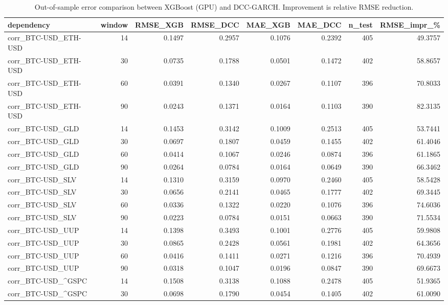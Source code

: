 \begin{table}[H]
\centering
\small
\caption{Out-of-sample error comparison between XGBoost (GPU) and DCC-GARCH. Improvement is relative RMSE reduction.}
\label{tab:rmse_xgb_vs_dcc}
\begin{tabular}{lrrrrrrr}
\toprule
dependency & window & RMSE\_XGB & RMSE\_DCC & MAE\_XGB & MAE\_DCC & n\_test & RMSE\_impr\_\% \\
\midrule
corr\_BTC-USD\_ETH-USD & 14 & 0.1497 & 0.2957 & 0.1076 & 0.2392 & 405 & 49.3757 \\
corr\_BTC-USD\_ETH-USD & 30 & 0.0735 & 0.1788 & 0.0501 & 0.1472 & 402 & 58.8657 \\
corr\_BTC-USD\_ETH-USD & 60 & 0.0391 & 0.1340 & 0.0267 & 0.1107 & 396 & 70.8033 \\
corr\_BTC-USD\_ETH-USD & 90 & 0.0243 & 0.1371 & 0.0164 & 0.1103 & 390 & 82.3135 \\
corr\_BTC-USD\_GLD & 14 & 0.1453 & 0.3142 & 0.1009 & 0.2513 & 405 & 53.7441 \\
corr\_BTC-USD\_GLD & 30 & 0.0697 & 0.1807 & 0.0459 & 0.1455 & 402 & 61.4046 \\
corr\_BTC-USD\_GLD & 60 & 0.0414 & 0.1067 & 0.0246 & 0.0874 & 396 & 61.1865 \\
corr\_BTC-USD\_GLD & 90 & 0.0264 & 0.0784 & 0.0164 & 0.0649 & 390 & 66.3462 \\
corr\_BTC-USD\_SLV & 14 & 0.1310 & 0.3159 & 0.0970 & 0.2460 & 405 & 58.5428 \\
corr\_BTC-USD\_SLV & 30 & 0.0656 & 0.2141 & 0.0465 & 0.1777 & 402 & 69.3445 \\
corr\_BTC-USD\_SLV & 60 & 0.0336 & 0.1322 & 0.0220 & 0.1076 & 396 & 74.6036 \\
corr\_BTC-USD\_SLV & 90 & 0.0223 & 0.0784 & 0.0151 & 0.0663 & 390 & 71.5534 \\
corr\_BTC-USD\_UUP & 14 & 0.1398 & 0.3493 & 0.1001 & 0.2776 & 405 & 59.9808 \\
corr\_BTC-USD\_UUP & 30 & 0.0865 & 0.2428 & 0.0561 & 0.1981 & 402 & 64.3656 \\
corr\_BTC-USD\_UUP & 60 & 0.0416 & 0.1411 & 0.0271 & 0.1216 & 396 & 70.4939 \\
corr\_BTC-USD\_UUP & 90 & 0.0318 & 0.1047 & 0.0196 & 0.0847 & 390 & 69.6673 \\
corr\_BTC-USD\_\textasciicircum GSPC & 14 & 0.1508 & 0.3138 & 0.1088 & 0.2478 & 405 & 51.9365 \\
corr\_BTC-USD\_\textasciicircum GSPC & 30 & 0.0698 & 0.1790 & 0.0454 & 0.1405 & 402 & 61.0090 \\

\end{tabular}
\end{table}
